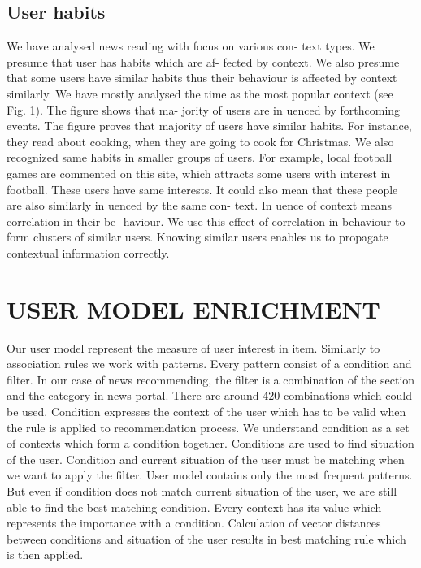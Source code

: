\documentclass{acm_proc_article-sp} %
\begin{document}
\subsection{User habits}
We have analysed news reading with focus on various con-
text types. We presume that user has habits which are af-
fected by context. We also presume that some users have
similar habits thus their behaviour is affected by context
similarly. We have mostly analysed the time as the most
popular context (see Fig. 1). The figure shows that ma-
jority of users are in
uenced by forthcoming events. The
figure proves that majority of users have similar habits. For
instance, they read about cooking, when they are going to
cook for Christmas.
We also recognized same habits in smaller groups of users.
For example, local football games are commented on this
site, which attracts some users with interest in football.
These users have same interests. It could also mean that
these people are also similarly in
uenced by the same con-
text. In
uence of context means correlation in their be-
haviour. We use this effect of correlation in behaviour to
form clusters of similar users. Knowing similar users enables
us to propagate contextual information correctly.

\section{USER MODEL ENRICHMENT}
Our user model represent the measure of user interest in
item. Similarly to association rules we work with patterns.
Every pattern consist of a condition and filter. In our case
of news recommending, the filter is a combination of the
section and the category in news portal. There are around
420 combinations which could be used.
Condition expresses the context of the user which has to
be valid when the rule is applied to recommendation process.
We understand condition as a set of contexts which form a
condition together. Conditions are used to find situation of
the user. Condition and current situation of the user must
be matching when we want to apply the filter.
User model contains only the most frequent patterns. But
even if condition does not match current situation of the
user, we are still able to find the best matching condition.
Every context has its value which represents the importance
with a condition. Calculation of vector distances between
conditions and situation of the user results in best matching
rule which is then applied.
\end{document}
